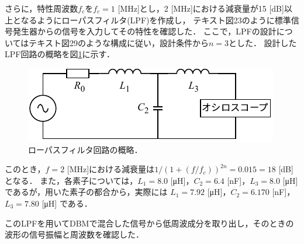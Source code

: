 \documentclass[uplatex,dvipdfmx,a4j,12pt]{jsarticle}
\begin{document}
さらに，特性周波数$f_c$を$f_c = 1$ [MHz]とし，2 [MHz]における減衰量が15 [dB]以上となるようにローパスフィルタ(LPF)を作成し，
テキスト図23のように標準信号発生器からの信号を入力してその特性を確認した．
ここで，LPFの設計についてはテキスト図29のような構成に従い，設計条件から$n = 3$とした．
設計したLPF回路の概略を図\ref{fig:4-circuit}に示す．
\begin{figure}[H]
    \centering
    \includegraphics[width=0.7\linewidth]{img/LPF.pdf}
    \caption{ローパスフィルタ回路の概略．}
    \label{fig:4-circuit}
\end{figure}
このとき，$f = 2$ [MHz]における減衰量は$1/(1 + (f/f_c))^{2n} = 0.015 = 18$ [dB]となる．
また，各素子については，$L_1  = 8.0$ [\si{\micro \henry}]，$C_2 = 6.4$ [\si{\nano \farad}]，$L_3 = 8.0$ [\si{\micro \henry}]であるが，用いた素子の都合から，実際には
$L_1  = 7.92$ [\si{\micro \henry}]，$C_2 = 6.170$ [\si{\nano \farad}]，$L_3 = 7.80$ [\si{\micro \henry}]
である．

このLPFを用いてDBMで混合した信号から低周波成分を取り出し，そのときの波形の信号振幅と周波数を確認した．
\end{document}
